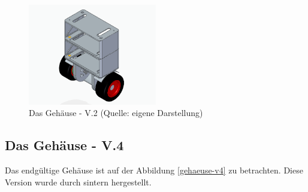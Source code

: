 \begin{figure}[!h]  %
	\centering\includegraphics[width=0.5\textwidth]{images/gehaeuse-v3.png}
	\caption{Das Gehäuse - V.2 \newline (Quelle: eigene Darstellung)}
	\label{gehaeuse-v3} %
\end{figure}

\subsection{Das Gehäuse - V.4}

Das endgültige Gehäuse ist auf der Abbildung \ref{gehaeuse-v4} zu betrachten. Diese Version wurde durch sintern hergestellt.

